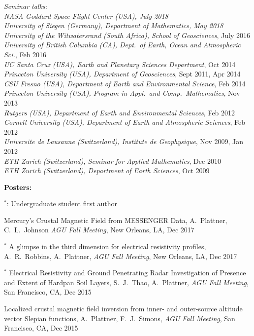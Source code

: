 \documentclass[10pt]{article}
\begin{document}
\spc
\emph{Seminar talks:}\\
\emph{NASA Goddard Space Flight Center (USA), July 2018}\\
\emph{University of Siegen (Germany), Department of Mathematics, May 2018}\\
\emph{University of the Witwatersrand (South Africa), School of Geosciences}, July 2016\\
\emph{University of British Columbia (CA), Dept.~of Earth, Ocean and Atmospheric Sci.}, Feb 2016\\
\emph{UC Santa Cruz (USA), Earth and Planetary Sciences Department}, Oct 2014\\
\emph{Princeton University (USA), Department of Geosciences}, Sept  2011, Apr 2014\\
\emph{CSU Fresno (USA), Department of Earth and Environmental Science}, Feb 2014\\
\emph{Princeton University (USA), Program in Appl.~and Comp.~Mathematics}, Nov 2013\\
\emph{Rutgers (USA), Department of Earth and Environmental Sciences}, Feb 2012\\
\emph{Cornell University (USA), Department of Earth and Atmospheric Sciences}, Feb 2012\\
\emph{Universite de Lausanne (Switzerland), Institute de Geophysique}, Nov 2009, Jan 2012\\
\emph{ETH Zurich (Switzerland), Seminar for Applied Mathematics}, Dec 2010\\
\emph{ETH Zurich (Switzerland), Department of Earth Sciences}, Oct 2009

\clearpage
\textbf{\tsize Posters:}

\spcp
$^*$: Undergraduate student first author

\spcp
Mercury's Crustal Magnetic Field from MESSENGER Data,
 A.~Plattner, C.~L.~Johnson 
\emph{AGU Fall Meeting}, New Orleans, LA, Dec 2017 

\spcp
\hspace{-0.4cm} $^*$ A glimpse in the third dimension for electrical
resistivity profiles,
A.~R.~Robbins, A.~Plattner,
\emph{AGU Fall Meeting}, New Orleans, LA, Dec 2017 

\spcp
\hspace{-0.4cm} $^*$ Electrical Resistivity and Ground Penetrating Radar 
Investigation of Presence and Extent of Hardpan Soil Layers,
 S.~J.~Thao, A.~Plattner,
\emph{AGU Fall Meeting}, San Francisco, CA, Dec 2015

\spcp
Localized crustal magnetic field inversion from inner- and outer-source altitude vector Slepian functions,
A.~Plattner,  F.~J.~Simons,
\emph{AGU Fall Meeting}, San Francisco, CA, Dec 2015
\end{document}
